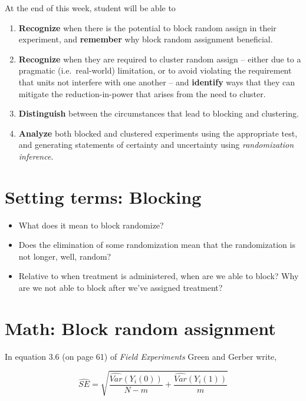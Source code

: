 \documentclass[
]{book}
\providecommand{\tightlist}{%
  \setlength{\itemsep}{0pt}\setlength{\parskip}{0pt}}
\begin{document}
At the end of this week, student will be able to

\begin{enumerate}
\def\labelenumi{\arabic{enumi}.}
\tightlist
\item
  \textbf{Recognize} when there is the potential to block random assign
  in their experiment, and \textbf{remember} why block random assignment
  beneficial.
\item
  \textbf{Recognize} when they are required to cluster random assign --
  either due to a pragmatic (i.e.~real-world) limitation, or to avoid
  violating the requirement that units not interfere with one another --
  and \textbf{identify} ways that they can mitigate the
  reduction-in-power that arises from the need to cluster.
\item
  \textbf{Distinguish} between the circumstances that lead to blocking
  and clustering.
\item
  \textbf{Analyze} both blocked and clustered experiments using the
  appropriate test, and generating statements of certainty and
  uncertainty using \emph{randomization inference}.
\end{enumerate}

\hypertarget{setting-terms-blocking}{%
\section{Setting terms: Blocking}\label{setting-terms-blocking}}

\begin{itemize}
\tightlist
\item
  What does it mean to block randomize?
\item
  Does the elimination of some randomization mean that the randomization
  is not longer, well, random?
\item
  Relative to when treatment is administered, when are we able to block?
  Why are we not able to block after we've assigned treatment?
\end{itemize}

\hypertarget{math-block-random-assignment}{%
\section{Math: Block random
assignment}\label{math-block-random-assignment}}

In equation 3.6 (on page 61) of \emph{Field Experiments} Green and
Gerber write,

\[ 
  \widehat{SE} = \sqrt{\frac{\widehat{Var}(Y_{i}(0))}{N-m} + \frac{\widehat{Var}(Y_{i}(1))}{m}}
\]
\end{document}
